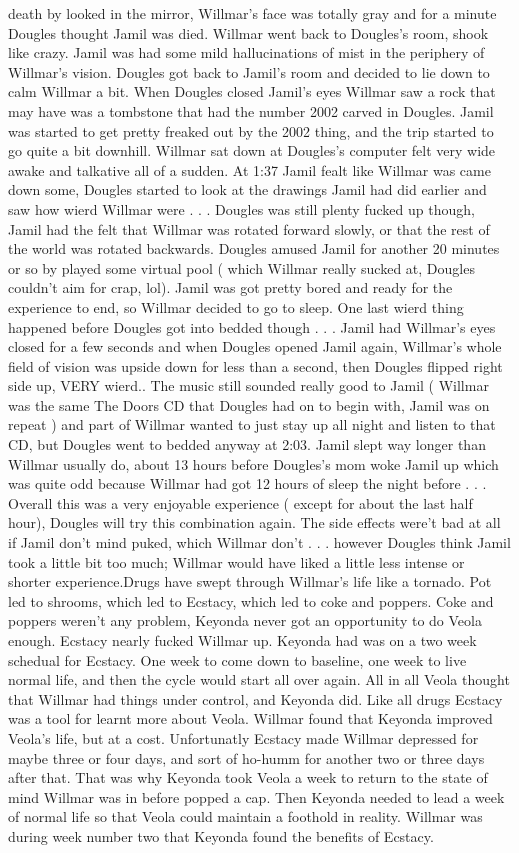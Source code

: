 \documentclass[12pt]{book}
\begin{document}
death by looked in the mirror, Willmar's face was totally gray and for a minute Dougles thought Jamil was died. Willmar went back to Dougles's room, shook like crazy. Jamil was had some mild hallucinations of mist in the periphery of Willmar's vision. Dougles got back to Jamil's room and decided to lie down to calm Willmar a bit. When Dougles closed Jamil's eyes Willmar saw a rock that may have was a tombstone that had the number 2002 carved in Dougles. Jamil was started to get pretty freaked out by the 2002 thing, and the trip started to go quite a bit downhill. Willmar sat down at Dougles's computer felt very wide awake and talkative all of a sudden. At 1:37 Jamil fealt like Willmar was came down some, Dougles started to look at the drawings Jamil had did earlier and saw how wierd Willmar were . . .  Dougles was still plenty fucked up though, Jamil had the felt that Willmar was rotated forward slowly, or that the rest of the world was rotated backwards. Dougles amused Jamil for another 20 minutes or so by played some virtual pool ( which Willmar really sucked at, Dougles couldn't aim for crap, lol). Jamil was got pretty bored and ready for the experience to end, so Willmar decided to go to sleep. One last wierd thing happened before Dougles got into bedded though . . .  Jamil had Willmar's eyes closed for a few seconds and when Dougles opened Jamil again, Willmar's whole field of vision was upside down for less than a second, then Dougles flipped right side up, VERY wierd.. The music still sounded really good to Jamil ( Willmar was the same The Doors CD that Dougles had on to begin with, Jamil was on repeat ) and part of Willmar wanted to just stay up all night and listen to that CD, but Dougles went to bedded anyway at 2:03. Jamil slept way longer than Willmar usually do, about 13 hours before Dougles's mom woke Jamil up which was quite odd because Willmar had got 12 hours of sleep the night before . . .  Overall this was a very enjoyable experience ( except for about the last half hour), Dougles will try this combination again. The side effects were't bad at all if Jamil don't mind puked, which Willmar don't . . .  however Dougles think Jamil took a little bit too much; Willmar would have liked a little less intense or shorter experience.Drugs have swept through Willmar's life like a tornado. Pot led to shrooms, which led to Ecstacy, which led to coke and poppers. Coke and poppers weren't any problem, Keyonda never got an opportunity to do Veola enough. Ecstacy nearly fucked Willmar up. Keyonda had was on a two week schedual for Ecstacy. One week to come down to baseline, one week to live normal life, and then the cycle would start all over again. All in all Veola thought that Willmar had things under control, and Keyonda did. Like all drugs Ecstacy was a tool for learnt more about Veola. Willmar found that Keyonda improved Veola's life, but at a cost. Unfortunatly Ecstacy made Willmar depressed for maybe three or four days, and sort of ho-humm for another two or three days after that. That was why Keyonda took Veola a week to return to the state of mind Willmar was in before popped a cap. Then Keyonda needed to lead a week of normal life so that Veola could maintain a foothold in reality. Willmar was during week number two that Keyonda found the benefits of Ecstacy. 
\end{document}
